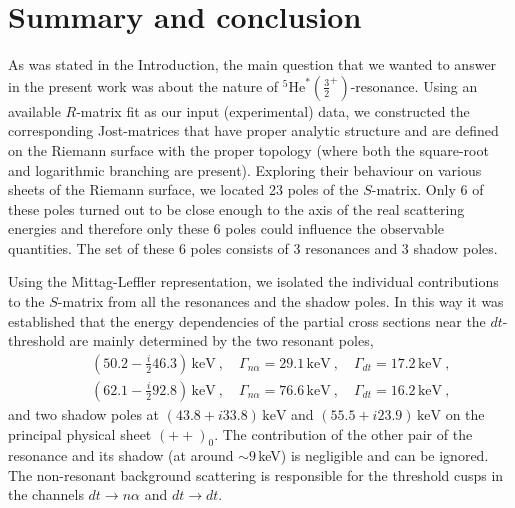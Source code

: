 \documentclass[12pt]{article}
\begin{document}
\section{Summary and conclusion}
\label{sec.conclusion}
As was stated in the Introduction, the main question that we wanted to answer
in the present work was about the nature of
${}^5\mathrm{He}^*(\frac32^+)$-resonance. Using an available $R$-matrix fit as
our input (experimental) data, we constructed the corresponding Jost-matrices
that have proper analytic structure 
and are defined on the Riemann surface with the proper topology (where both the 
square-root and logarithmic branching are present).
Exploring their behaviour on various sheets
of the Riemann surface, we located 23 poles of the $S$-matrix. Only 6 of these
poles turned out to be close enough to the axis of the real scattering energies
and therefore only these 6 poles could influence the observable quantities. The
set of these 6 poles consists of 3 resonances and 3 shadow poles.

Using the Mittag-Leffler representation, we isolated the
individual contributions to the $S$-matrix from all the resonances and the 
shadow poles. In this way it was established that the energy dependencies of the
partial cross sections near the $dt$-threshold are mainly determined by the two
resonant poles,
\begin{eqnarray*}
    &&\left(50.2-\frac{i}{2}46.3\right)\,\mathrm{keV}\ ,
    \quad \Gamma_{n\alpha}=29.1\,\mathrm{keV}\ ,
    \quad \Gamma_{dt}=17.2\,\mathrm{keV}\ ,\\
    &&\left(62.1-\frac{i}{2}92.8\right)\,\mathrm{keV}\ ,
    \quad \Gamma_{n\alpha}=76.6\,\mathrm{keV}\ ,
    \quad \Gamma_{dt}=16.2\,\mathrm{keV}\ ,
\end{eqnarray*}
and two shadow poles at
$\left(43.8+i33.8\right)\,\mathrm{keV}$ and
$\left(55.5+i23.9\right)\,\mathrm{keV}$ on the principal physical sheet
$(++)_0$.
The contribution of the other pair of the resonance and its shadow (at around
$\sim9$\,keV) is negligible and can be ignored. The non-resonant background
scattering is responsible for the threshold cusps in the channels
$dt\to n\alpha$ and $dt\to dt$.

\appendixpage
\appendix
\end{document}
